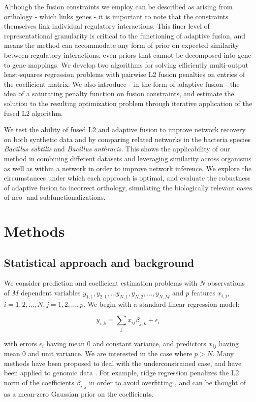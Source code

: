 \documentclass[11pt]{article}
\begin{document}
Although the fusion constraints we employ can be described as arising from orthology - which links genes - it is important to note that the constraints themselves link individual regulatory interactions. This finer level of representational granularity is critical to the functioning of adaptive fusion, and means the method can accommodate any form of prior on expected similarity between regulatory interactions, even priors that cannot be decomposed into gene to gene mappings. We develop two algorithms for solving efficiently multi-output least-squares regression problems with pairwise L2 fusion penalties on entries of the coefficient matrix. We also introduce - in the form of adaptive fusion - the idea of a saturating penalty function on fusion constraints, and estimate the solution to the resulting optimization problem through iterative application of the fused L2 algorithm.

We test the ability of fused L2 and adaptive fusion to improve network recovery on both synthetic data and by comparing related networks in the bacteria species \textit{Bacillus subtilis} and \textit{Bacillus anthracis}. This shows the applicability of our method in combining different datasets and leveraging similarity across organisms as well as within a network in order to improve network inference. We explore the circumstances under which each approach is optimal, and evaluate the robustness of adaptive fusion to incorrect orthology, simulating the biologically relevant cases of neo- and subfunctionalizations. 


\section{Methods}

\subsection{Statistical approach and background}
We consider prediction and coefficient estimation problems with $N$ observations of $M$ dependent variables $y_{1,1}, y_{2,1}, ...y_{N,1}, y_{N,2},..., y_{N, M}$ and $p$ features $x_{i,j}$, $i=1,2,...,N, j=1,2,...,p$. We begin with a standard linear regression model:

\begin{equation}
y_{i,k} = \displaystyle\sum_{j}x_{ij}\beta_{j,k} + \epsilon_i
\end{equation}

with errors $\epsilon_i$ having mean 0 and constant variance, and predictors $x_{ij}$ having mean 0 and unit variance. We are interested in the case where $p > N$. Many methods have been proposed to deal with the underconstrained case, and have been applied to genomic data \cite{waldron_optimized_2011, li_network-constrained_2008}. For example, ridge regression penalizes the L2 norm of the coefficients $\beta_{i,j}$ in order to avoid overfitting \cite{hoerl_ridge_1970}, and can be thought of as a mean-zero Gaussian prior on the coefficients. 
\end{document}
